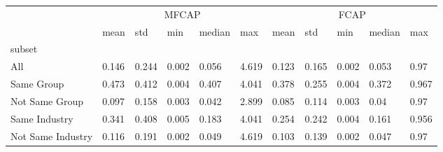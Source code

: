 \begin{tabular}{lllllllllll}
\toprule
 & \multicolumn{5}{c}{MFCAP} & \multicolumn{5}{c}{FCAP} \\
 \cmidrule(lr){2-6} \cmidrule(lr){7-11}
 &       mean &    std &    min & median &    max &         mean &    std &    min & median &    max \\
subset            &            &        &        &        &        &              &        &        &        &        \\
\midrule
All               &      0.146 &  0.244 &  0.002 &  0.056 &  4.619 &        0.123 &  0.165 &  0.002 &  0.053 &   0.97 \\
Same Group        &      0.473 &  0.412 &  0.004 &  0.407 &  4.041 &        0.378 &  0.255 &  0.004 &  0.372 &  0.967 \\
Not Same Group    &      0.097 &  0.158 &  0.003 &  0.042 &  2.899 &        0.085 &  0.114 &  0.003 &   0.04 &   0.97 \\
Same Industry     &      0.341 &  0.408 &  0.005 &  0.183 &  4.041 &        0.254 &  0.242 &  0.004 &  0.161 &  0.956 \\
Not Same Industry &      0.116 &  0.191 &  0.002 &  0.049 &  4.619 &        0.103 &  0.139 &  0.002 &  0.047 &   0.97 \\
\bottomrule
\end{tabular}
